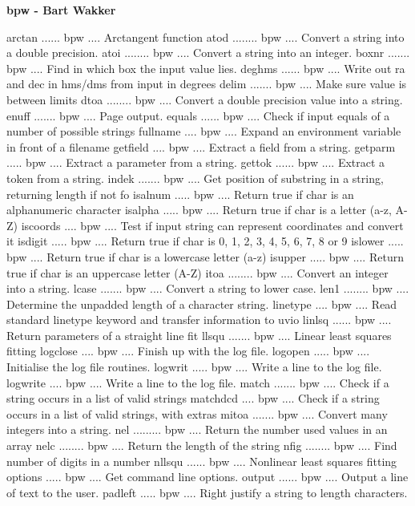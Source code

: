\par\centerline {\bf bpw - Bart Wakker}
{\eightpoint\begintt
arctan ...... bpw .... Arctangent function 
atod ........ bpw .... Convert a string into a double precision. 
atoi ........ bpw .... Convert a string into an integer. 
boxnr ....... bpw .... Find in which box the input value lies. 
deghms ...... bpw .... Write out ra and dec in hms/dms from input in degrees 
\endtt}
{\eightpoint\begintt
delim ....... bpw .... Make sure value is between limits 
dtoa ........ bpw .... Convert a double precision value into a string. 
enuff ....... bpw .... Page output. 
equals ...... bpw .... Check if input equals of a number of possible strings 
fullname .... bpw .... Expand an environment variable in front of a filename 
\endtt}
{\eightpoint\begintt
getfield .... bpw .... Extract a field from a string. 
getparm ..... bpw .... Extract a parameter from a string. 
gettok ...... bpw .... Extract a token from a string. 
indek ....... bpw .... Get position of substring in a string, returning length if not fo 
isalnum ..... bpw .... Return true if char is an alphanumeric character 
\endtt}
{\eightpoint\begintt
isalpha ..... bpw .... Return true if char is a letter (a-z, A-Z) 
iscoords .... bpw .... Test if input string can represent coordinates and convert it 
isdigit ..... bpw .... Return true if char is 0, 1, 2, 3, 4, 5, 6, 7, 8 or 9 
islower ..... bpw .... Return true if char is a lowercase letter (a-z) 
isupper ..... bpw .... Return true if char is an uppercase letter (A-Z) 
\endtt}
{\eightpoint\begintt
itoa ........ bpw .... Convert an integer into a string. 
lcase ....... bpw .... Convert a string to lower case. 
len1 ........ bpw .... Determine the unpadded length of a character string. 
linetype .... bpw .... Read standard linetype keyword and transfer information to uvio 
linlsq ...... bpw .... Return parameters of a straight line fit 
\endtt}
{\eightpoint\begintt
llsqu ....... bpw .... Linear least squares fitting 
logclose .... bpw .... Finish up with the log file. 
logopen ..... bpw .... Initialise the log file routines. 
logwrit ..... bpw .... Write a line to the log file. 
logwrite .... bpw .... Write a line to the log file. 
\endtt}
{\eightpoint\begintt
match ....... bpw .... Check if a string occurs in a list of valid strings 
matchdcd .... bpw .... Check if a string occurs in a list of valid strings, with extras 
mitoa ....... bpw .... Convert many integers into a string. 
nel ......... bpw .... Return the number used values in an array 
nelc ........ bpw .... Return the length of the string 
\endtt}
{\eightpoint\begintt
nfig ........ bpw .... Find number of digits in a number 
nllsqu ...... bpw .... Nonlinear least squares fitting 
options ..... bpw .... Get command line options. 
output ...... bpw .... Output a line of text to the user. 
padleft ..... bpw .... Right justify a string to length characters. 
\endtt}
